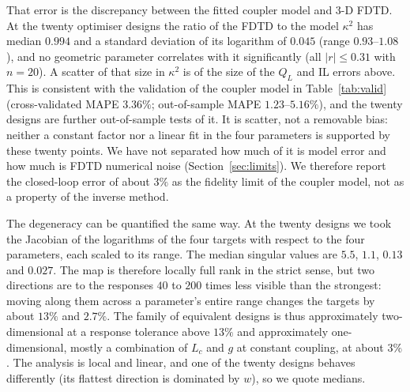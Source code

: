 \documentclass[11pt]{article}
\newcommand{\QL}{Q_L}
\begin{document}
That error is the discrepancy between the fitted coupler model and 3-D FDTD. At the twenty optimiser designs the ratio of the FDTD to the model $\kappa^2$ has median $0.994$ and a standard deviation of its logarithm of $0.045$ (range $0.93$--$1.08$), and no geometric parameter correlates with it significantly (all $|r| \le 0.31$ with $n = 20$). A scatter of that size in $\kappa^2$ is of the size of the $\QL$ and IL errors above. This is consistent with the validation of the coupler model in Table~\ref{tab:valid} (cross-validated MAPE $3.36\%$; out-of-sample MAPE $1.23$--$5.16\%$), and the twenty designs are further out-of-sample tests of it. It is scatter, not a removable bias: neither a constant factor nor a linear fit in the four parameters is supported by these twenty points. We have not separated how much of it is model error and how much is FDTD numerical noise (Section~\ref{sec:limits}). We therefore report the closed-loop error of about $3\%$ as the fidelity limit of the coupler model, not as a property of the inverse method.

The degeneracy can be quantified the same way. At the twenty designs we took the Jacobian of the logarithms of the four targets with respect to the four parameters, each scaled to its range. The median singular values are $5.5$, $1.1$, $0.13$ and $0.027$. The map is therefore locally full rank in the strict sense, but two directions are to the responses $40$ to $200$ times less visible than the strongest: moving along them across a parameter's entire range changes the targets by about $13\%$ and $2.7\%$. The family of equivalent designs is thus approximately two-dimensional at a response tolerance above $13\%$ and approximately one-dimensional, mostly a combination of $L_c$ and $g$ at constant coupling, at about $3\%$. The analysis is local and linear, and one of the twenty designs behaves differently (its flattest direction is dominated by $w$), so we quote medians.
\end{document}
